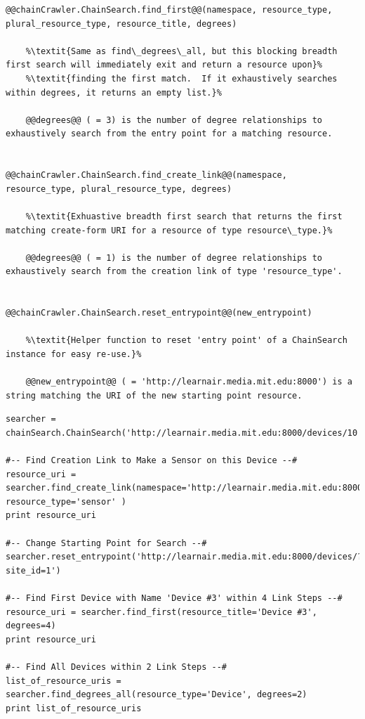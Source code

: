 \begin{lstlisting}[style=codedef]
@@chainCrawler.ChainSearch.find_first@@(namespace, resource_type, plural_resource_type, resource_title, degrees)
	
	%\textit{Same as find\_degrees\_all, but this blocking breadth first search will immediately exit and return a resource upon}% 
	%\textit{finding the first match.  If it exhaustively searches within degrees, it returns an empty list.}%

	@@degrees@@ ( = 3) is the number of degree relationships to exhaustively search from the entry point for a matching resource.


@@chainCrawler.ChainSearch.find_create_link@@(namespace, resource_type, plural_resource_type, degrees)
	
	%\textit{Exhuastive breadth first search that returns the first matching create-form URI for a resource of type resource\_type.}% 

	@@degrees@@ ( = 1) is the number of degree relationships to exhaustively search from the creation link of type 'resource_type'.


@@chainCrawler.ChainSearch.reset_entrypoint@@(new_entrypoint)
	
	%\textit{Helper function to reset 'entry point' of a ChainSearch instance for easy re-use.}% 

	@@new_entrypoint@@ ( = 'http://learnair.media.mit.edu:8000') is a string matching the URI of the new starting point resource.

\end{lstlisting}



\begin{lstlisting}[style=code]
searcher = chainSearch.ChainSearch('http://learnair.media.mit.edu:8000/devices/10')

#-- Find Creation Link to Make a Sensor on this Device --#
resource_uri = searcher.find_create_link(namespace='http://learnair.media.mit.edu:8000/rels/', resource_type='sensor' )
print resource_uri

#-- Change Starting Point for Search --#
searcher.reset_entrypoint('http://learnair.media.mit.edu:8000/devices/?site_id=1')

#-- Find First Device with Name 'Device #3' within 4 Link Steps --# 
resource_uri = searcher.find_first(resource_title='Device #3', degrees=4)
print resource_uri

#-- Find All Devices within 2 Link Steps --#
list_of_resource_uris = searcher.find_degrees_all(resource_type='Device', degrees=2)
print list_of_resource_uris
\end{lstlisting}



